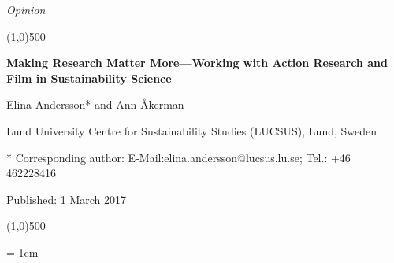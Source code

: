 \documentclass[10pt,a4paper]{article}
\begin{document}
\flushcolumns
\raggedcolumns

\pagestyle{document}
\thispagestyle{firstpage}

\vspace*{70pt}

\setlength{\parindent}{0cm}
\textit{Opinion}
\vspace*{-12pt}

\begin{center}
\line(1,0){500}
\end{center}

\vspace*{12pt}
\begin{flushleft}
\begin{LARGE}
\textbf{{\color{LibrelloColor} Making Research Matter More---Working with Action Research and Film in Sustainability Science}}\\
\end{LARGE}

\vspace*{12pt}

Elina Andersson* and Ann Åkerman

\vspace*{6pt}

Lund University Centre for Sustainability Studies (LUCSUS),  Lund, Sweden

\vspace*{6pt}

* Corresponding author: E-Mail:elina.andersson@lucsus.lu.se; Tel.: +46 462228416
%

Published: 1 March 2017
\end{flushleft}
\setcounter{page}{24}


\vspace*{-18pt}
\begin{center}
\line(1,0){500}
\end{center}

\vspace*{12pt}

\begingroup\leftskip= 1cm\rightskip 1cm  

\end{document}
